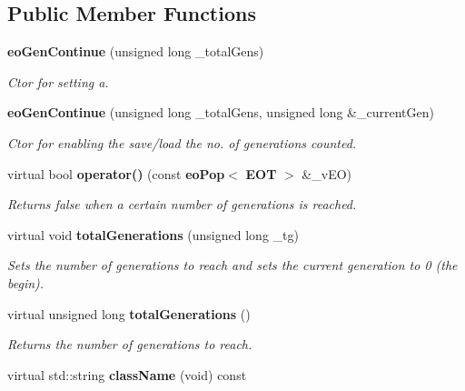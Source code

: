 \subsection*{Public Member Functions}
\begin{CompactItemize}
\item 
{\bf eo\-Gen\-Continue} (unsigned long \_\-total\-Gens)\label{classeo_gen_continue_a0}

\begin{CompactList}\small\item\em Ctor for setting a. \item\end{CompactList}\item 
{\bf eo\-Gen\-Continue} (unsigned long \_\-total\-Gens, unsigned long \&\_\-current\-Gen)\label{classeo_gen_continue_a1}

\begin{CompactList}\small\item\em Ctor for enabling the save/load the no. of generations counted. \item\end{CompactList}\item 
virtual bool {\bf operator()} (const {\bf eo\-Pop}$<$ {\bf EOT} $>$ \&\_\-v\-EO)\label{classeo_gen_continue_a2}

\begin{CompactList}\small\item\em Returns false when a certain number of generations is reached. \item\end{CompactList}\item 
virtual void {\bf total\-Generations} (unsigned long \_\-tg)\label{classeo_gen_continue_a3}

\begin{CompactList}\small\item\em Sets the number of generations to reach and sets the current generation to 0 (the begin). \item\end{CompactList}\item 
virtual unsigned long {\bf total\-Generations} ()\label{classeo_gen_continue_a4}

\begin{CompactList}\small\item\em Returns the number of generations to reach. \item\end{CompactList}\item 
virtual std::string {\bf class\-Name} (void) const \label{classeo_gen_continue_a5}


\end{CompactItemize}
